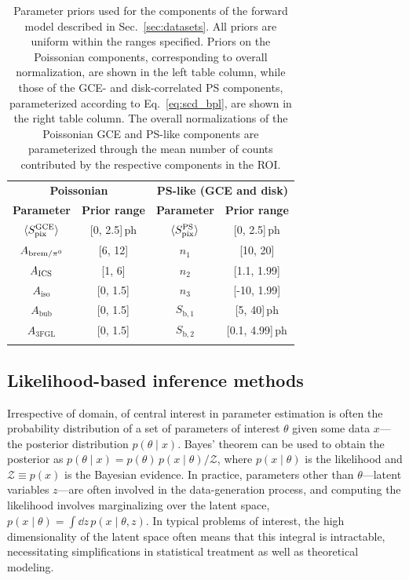 \documentclass[prd,aps,10pt,nofootinbib,twocolumn,superscriptaddress,preprintnumbers,balancelastpage,longbibliography]{revtex4-1}
\newcommand\Tstrut{\rule{0pt}{2.6ex}}         %
\newcommand\Bstrut{\rule[-0.9ex]{0pt}{0pt}}   %
\begin{document}
\begin{table}[tb]
\footnotesize
\begin{center}
\begin{tabular}{cc|cc}
\toprule
\multicolumn{2}{c}{\textbf{Poissonian}} & \multicolumn{2}{c}{\textbf{PS-like (GCE and disk)}}\Tstrut\Bstrut	\\   
\Xhline{1\arrayrulewidth}
\textbf{Parameter}	 & \textbf{Prior range}  & \textbf{Parameter}	&  \textbf{Prior range}\Tstrut\Bstrut	\\   
\Xhline{1\arrayrulewidth}
$\langle S_{\rm pix}^{\rm GCE} \rangle$ & [0, 2.5]\,ph  & $\langle S_{\rm pix}^{\rm PS} \rangle$ & [0, 2.5]\,ph\Tstrut\Bstrut \\
$A_{{\rm brem}/\pi^0}$ & [6, 12]  &  $n_1$ & [10, 20]\Tstrut\Bstrut  \\ 
$A_{\rm ICS}$  & [1, 6]  & $n_2$ & [1.1, 1.99]\Tstrut\Bstrut  \\ 
$A_\text{iso}$ & [0, 1.5] &  $n_3$ & [-10, 1.99]\Tstrut\Bstrut \\
$A_\text{bub}$ & [0, 1.5] &  $S_{\mathrm b,1}$ & [5, 40]\,ph\Tstrut\Bstrut \\
$A_\text{3FGL}$ & [0, 1.5] & $S_{\mathrm b,2}$  & [0.1, 4.99]\,ph\Tstrut\Bstrut \\
\botrule
\end{tabular}
\end{center}
\caption{Parameter priors used for the components of the forward model described in Sec.~\ref{sec:datasets}. All priors are uniform within the ranges specified. Priors on the Poissonian components, corresponding to overall normalization, are shown in the left table column, while those of the GCE- and disk-correlated PS components, parameterized according to Eq.~\eqref{eq:scd_bpl}, are shown in the right table column. The overall normalizations of the Poissonian GCE and PS-like components are parameterized through the mean number of counts contributed by the respective components in the ROI.}
\label{tab:priors}
\end{table}  

\subsection{Likelihood-based inference methods}
\label{sec:likelihood-methods}

Irrespective of domain, of central interest in parameter estimation is often the probability distribution of a set of parameters of interest $\theta$ given some data $x$---the posterior distribution $p(\theta\mid x)$. Bayes' theorem can be used to obtain the posterior as $p(\theta\mid x) = p(\theta)\, p(x\mid\theta) / \mathcal Z$, where $p(x\mid\theta)$ is the likelihood and $\mathcal Z \equiv p(x)$ is the Bayesian evidence. In practice, parameters other than $\theta$---latent variables $z$---are often involved in the data-generation process, and computing the likelihood involves marginalizing over the latent space, $p(x\mid\theta) = \int \dd z\,p(x\mid\theta, z)$. In typical problems of interest, the high dimensionality of the latent space often means that this integral is intractable, necessitating simplifications in statistical treatment as well as theoretical modeling. 
\end{document}
